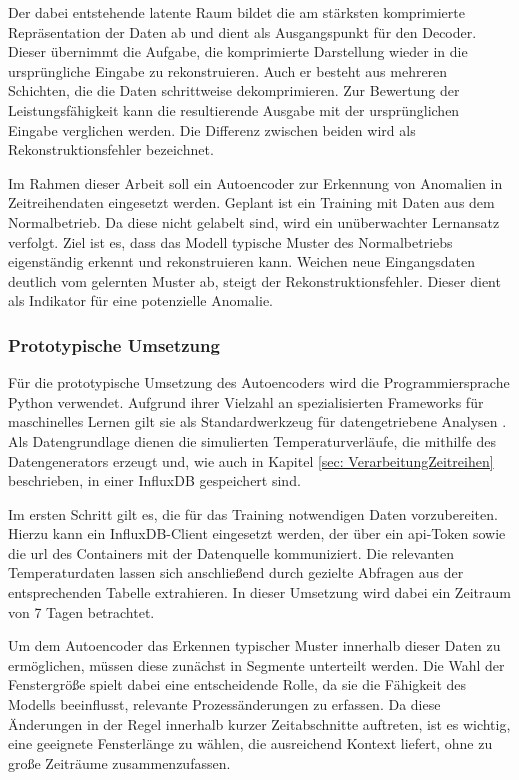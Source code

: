 Der dabei entstehende latente Raum bildet die am stärksten komprimierte Repräsentation der Daten ab und dient als Ausgangspunkt für den Decoder.
Dieser übernimmt die Aufgabe, die komprimierte Darstellung wieder in die ursprüngliche Eingabe zu rekonstruieren. 
Auch er besteht aus mehreren Schichten, die die Daten schrittweise dekomprimieren.
Zur Bewertung der Leistungsfähigkeit kann die resultierende Ausgabe mit der ursprünglichen Eingabe verglichen werden. 
Die Differenz zwischen beiden wird als Rekonstruktionsfehler bezeichnet. \cite{Autoencoder}

Im Rahmen dieser Arbeit soll ein Autoencoder zur Erkennung von Anomalien in Zeitreihendaten eingesetzt werden. 
Geplant ist ein Training mit Daten aus dem Normalbetrieb. 
Da diese nicht gelabelt sind, wird ein unüberwachter Lernansatz verfolgt. 
Ziel ist es, dass das Modell typische Muster des Normalbetriebs eigenständig erkennt und rekonstruieren kann. 
Weichen neue Eingangsdaten deutlich vom gelernten Muster ab, steigt der Rekonstruktionsfehler.
Dieser dient als Indikator für eine potenzielle Anomalie.

\subsubsection{Prototypische Umsetzung}
Für die prototypische Umsetzung des Autoencoders wird die Programmiersprache Python verwendet. 
Aufgrund ihrer Vielzahl an spezialisierten Frameworks für maschinelles Lernen gilt sie als Standardwerkzeug für datengetriebene Analysen \cite{Python}.
Als Datengrundlage dienen die simulierten Temperaturverläufe, die mithilfe des Datengenerators erzeugt und, wie auch in Kapitel \ref{sec: VerarbeitungZeitreihen} beschrieben, in einer InfluxDB gespeichert sind.

Im ersten Schritt gilt es, die für das Training notwendigen Daten vorzubereiten. 
Hierzu kann ein InfluxDB-Client eingesetzt werden, der über ein \acs{api}-Token sowie die \acs{url} des Containers mit der Datenquelle kommuniziert.
Die relevanten Temperaturdaten lassen sich anschließend durch gezielte Abfragen aus der entsprechenden Tabelle extrahieren.
In dieser Umsetzung wird dabei ein Zeitraum von 7 Tagen betrachtet.

Um dem Autoencoder das Erkennen typischer Muster innerhalb dieser Daten zu ermöglichen, müssen diese zunächst in Segmente unterteilt werden.
Die Wahl der Fenstergröße spielt dabei eine entscheidende Rolle, da sie die Fähigkeit des Modells beeinflusst, relevante Prozessänderungen zu erfassen.
Da diese Änderungen in der Regel innerhalb kurzer Zeitabschnitte auftreten, ist es wichtig, eine geeignete Fensterlänge zu wählen, die ausreichend Kontext liefert, ohne zu große Zeiträume zusammenzufassen.


